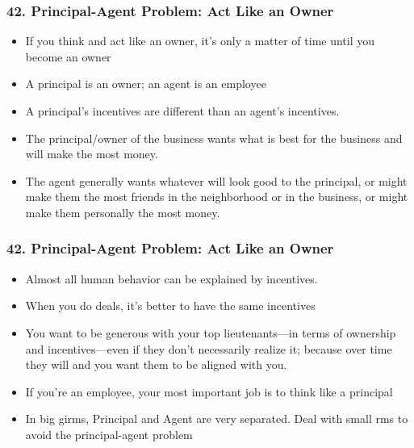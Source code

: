 \begin{frame}[fragile]
\frametitle{42. Principal-Agent Problem: Act Like an Owner}
\begin{itemize}
\item If you think and act like an owner, it's only a matter of time until you become an owner
\item A principal is an owner; an agent is an employee
\item A principal's incentives are different than an agent's incentives.
\item The principal/owner of the business wants what is best for the business and will make the most money. 
\item  The agent generally wants whatever will look good to the principal, or might make them the most friends in the neighborhood or in the business, or might make them personally the most money.
\end{itemize}
\end{frame}

\begin{frame}[fragile]
\frametitle{42. Principal-Agent Problem: Act Like an Owner}
\begin{itemize}
\item Almost all human behavior can be explained by incentives.
\item When you do deals, it’s better to have the same incentives
\item  You want to be generous with your top lieutenants—in terms of ownership and incentives—even if they don’t necessarily
realize it; because over time they will and you want them to be aligned with you.
\item If you’re an employee, your most important job is to think like a principal
\item In big girms, Principal and Agent are very separated. Deal with small  rms to avoid the principal-agent problem
\end{itemize}
\end{frame}


